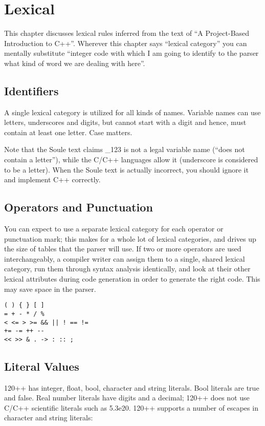 \chapter{Lexical}

This chapter discusses lexical rules inferred from the text of ``A
Project-Based Introduction to C++''.  Wherever this chapter says
``lexical category'' you can mentally substitute ``integer code with
which I am going to identify to the parser what kind of word we are
dealing with here''.

\section{Identifiers}

A single lexical category is utilized for all kinds of names.
Variable names can use letters, underscores and digits, but cannot
start with a digit and hence, must contain at least one letter.  Case
matters.

Note that the Soule text claims \_123 is not a legal variable
name (``does not contain a letter''), while the C/C++ languages allow it
(underscore is considered to be a letter). When the Soule text is actually
incorrect, you should ignore it and implement C++ correctly.

\section{Operators and Punctuation}

You can expect to use a separate lexical category for each
operator or punctuation mark; this makes for a whole lot of
lexical categories, and drives
up the size of tables that the parser will use. If two or more
operators are used interchangeably, a compiler writer can assign them
to a single, shared lexical category, run them through syntax analysis
identically, and look at their other lexical attributes during code
generation in order to generate the right code. This may save space
in the parser.

\begin{verbatim}
( ) { } [ ]
= + - * / %
< <= > >= && || ! == != 
+= -= ++ --
<< >> & . -> : :: ;
\end{verbatim}

\section{Literal Values}

120++ has integer, float, bool, character and string literals.
Bool literals are true and false.
Real number literals have digits and a decimal; 120++
does not use C/C++ scientific literals such as 5.3e20.  
120++ supports a number of escapes in character and string literals:

